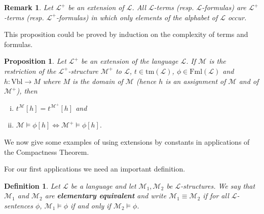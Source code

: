\documentclass[11pt]{article}
\newcommand{\tm}{\textrm{tm}}
\newcommand{\Fml}{\textrm{Fml}}
\newcommand{\Vbl}{\textrm{Vbl}}
\newtheorem{remark}[theorem]{Remark}
\newtheorem{proposition}[theorem]{Proposition}
\newtheorem{definition}[theorem]{Definition}
\newcommand{\mcal}[1]{\mathcal{#1}}
\begin{document}
\begin{remark}Let $\mcal{L}^+$ be an extension of $\mcal{L}$.
All $\mcal{L}$-terms (resp. $\mcal{L}$-formulas) are $\mcal{L}^+$-terms (resp. $\mcal{L}^+$-formulas) in which only elements of the alphabet of $\mcal{L}$ occur.
\end{remark}

This proposition could be proved by induction on the complexity of terms and formulas.
\begin{proposition}
Let $\mcal{L} ^+$ be an extension of the language $\mcal{L} $.
If $\mcal{M} $ is the restriction of the $\mcal{L} ^+$-structure $\mcal{M} ^+$
to $\mcal{L}$, $t\in \tm(\mcal{L}) $, $\phi \in \Fml(\mcal{L}) $ and $h:\Vbl \rightarrow M$ where $M$ is the domain of $\mcal{M}$
(hence $h$ is an assignment of $\mcal{M} $ and of $\mcal{M} ^+$), then
\begin{enumerate}[(i)]
\item $t^\mcal{M} [h]=t^{\mcal{M} ^+}[h]$ and
\item $\mcal{M} \models \phi [h]\iff \mcal{M} ^+\models \phi [h].$
\end{enumerate}
\end{proposition}


We now give some examples of using extensions by constants in applications of the Compactness Theorem.

For our first applications we need an important definition.

\begin{definition}
Let $\mcal{L}$ be a language and let $\mcal{M}_1,\mcal{M}_2$ be $\mcal{L}$-structures. We say that $\mcal{M}_1$ and $\mcal{M}_2$ are \textbf{elementary equivalent} and write $\mcal{M}_1\equiv \mcal{M}_2$ if for all $\mcal{L}$-sentences $\phi$, $\mcal{M}_1\models \phi$ if and only if $\mcal{M}_2\models \phi$.
\end{definition}
\end{document}
